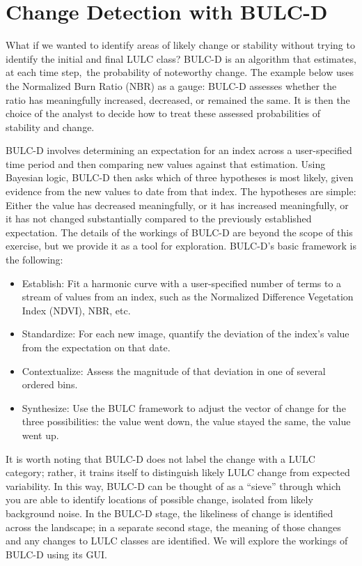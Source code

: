 \documentclass[
  letterpaper,
  DIV=11,
  numbers=noendperiod]{scrreprt}
\providecommand{\tightlist}{%
  \setlength{\itemsep}{0pt}\setlength{\parskip}{0pt}}\usepackage{longtable,booktabs,array}
\begin{document}
\hypertarget{change-detection-with-bulc-d}{%
\section{Change Detection with
BULC-D}\label{change-detection-with-bulc-d}}

What if we wanted to identify areas of likely change or stability
without trying to identify the initial and final LULC class? BULC-D is
an algorithm that estimates, at each time step,~the probability of
noteworthy change. The example below uses the Normalized Burn Ratio
(NBR) as a gauge: BULC-D assesses whether the ratio has meaningfully
increased, decreased, or remained the same. It is then the choice of the
analyst to decide how to treat these assessed probabilities of stability
and change.

BULC-D involves determining an expectation for an index across a
user-specified time period and then comparing new values against that
estimation. Using Bayesian logic, BULC-D then asks which of three
hypotheses is most likely, given evidence from the new values to date
from that index. The hypotheses are simple: Either the value has
decreased meaningfully, or it has increased meaningfully, or it has not
changed substantially compared to the previously established
expectation. The details of the workings of BULC-D are beyond the scope
of this exercise, but we provide it as a tool for exploration. BULC-D's
basic framework is the following:

\begin{itemize}
\tightlist
\item
  Establish: Fit a harmonic curve with a user-specified number of terms
  to a stream of values from an index, such as the Normalized Difference
  Vegetation Index (NDVI), NBR, etc.
\item
  Standardize: For each new image, quantify the deviation of the index's
  value from the expectation on that date.
\item
  Contextualize: Assess the magnitude of that deviation in one of
  several ordered bins.
\item
  Synthesize: Use the BULC framework to adjust the vector of change for
  the three possibilities: the value went down, the value stayed the
  same, the value went up.
\end{itemize}

It is worth noting that BULC-D does not label the change with a LULC
category; rather, it trains itself to distinguish likely LULC change
from expected variability. In this way, BULC-D can be thought of as a
``sieve'' through which you are able to identify locations of possible
change, isolated from likely background noise. In the BULC-D stage, the
likeliness of change is identified across the landscape; in a separate
second stage, the meaning of those changes and any changes to LULC
classes are identified. We will explore the workings of BULC-D using its
GUI.
\end{document}
